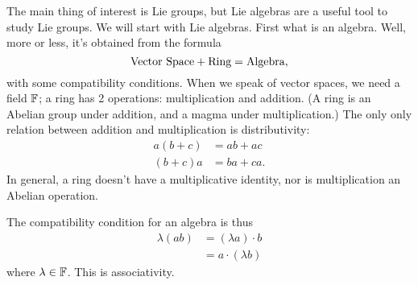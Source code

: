 The main thing of interest is Lie groups, but Lie algebras are a
useful tool to study Lie groups. We will start with Lie
algebras. First what is an algebra. Well, more or less, it's
obtained from the formula
\begin{equation}
\hbox{Vector Space}+\hbox{Ring}=\hbox{Algebra},
\end{equation}
with some compatibility conditions. %
When
we speak of vector spaces, we need a field $\Bbb{F}$; a ring has 2
operations: multiplication and addition. (A ring is an Abelian
group under addition, and a magma under multiplication.)
The only only relation between addition and multiplication is
distributivity: 
\begin{subequations}
\begin{align}
a(b+c)&=ab+ac\\
(b+c)a&=ba+ca.
\end{align}
\end{subequations}
In general, a ring doesn't have a multiplicative identity, nor is
multiplication an Abelian operation.

The compatibility condition for an algebra is thus
\begin{subequations}
\begin{align}
\lambda(ab) &= (\lambda a)\cdot b\\
&= a\cdot(\lambda b)
\end{align}
\end{subequations}
where $\lambda\in\Bbb{F}$. This is associativity. 

